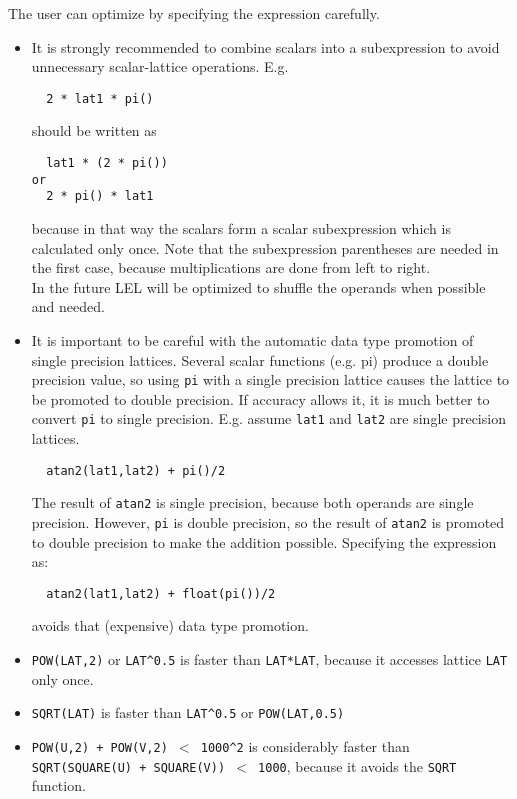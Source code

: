 The user can optimize by specifying the expression carefully.
\begin{itemize}
\item
It is strongly recommended to combine scalars into a subexpression to
avoid unnecessary scalar-lattice operations. E.g.
\begin{verbatim}
  2 * lat1 * pi()
\end{verbatim}
should be written as
\begin{verbatim}
  lat1 * (2 * pi())
or
  2 * pi() * lat1
\end{verbatim}
because in that way the scalars form a scalar subexpression
which is calculated only once. Note that the subexpression parentheses
are needed in the first case, because multiplications are done from
left to right.
\\In the future LEL will be optimized to shuffle the operands when
possible and needed.

\item
It is important to be careful with the automatic data type promotion
of single precision lattices. Several scalar functions (e.g. pi)
produce a double precision value, so using \texttt{pi} with a
single precision lattice causes the lattice to be promoted to double
precision. If accuracy allows it, it is much better to convert
\texttt{pi} to single precision.
E.g. assume \texttt{lat1} and \texttt{lat2} are single precision lattices.
\begin{verbatim}
  atan2(lat1,lat2) + pi()/2
\end{verbatim}
The result of \texttt{atan2} is single precision, because both
operands are single precision. However, \texttt{pi} is double
precision, so the result of \texttt{atan2} is promoted to double
precision to make the addition possible. Specifying the expression as:
\begin{verbatim}
  atan2(lat1,lat2) + float(pi())/2
\end{verbatim}
avoids that (expensive) data type promotion.

\item
\texttt{POW(LAT,2)} or \texttt{LAT}\verb+^+\texttt{0.5}
is faster than \texttt{LAT*LAT}, because it accesses lattice
\texttt{LAT} only once.

\item
\texttt{SQRT(LAT)} is faster than \texttt{LAT}\verb+^+\texttt{0.5}
or \texttt{POW(LAT,0.5)}

\item
\texttt{POW(U,2) + POW(V,2) $<$ 1000}\verb+^+\texttt{2} is considerably faster
than
\\\texttt{SQRT(SQUARE(U) + SQUARE(V)) $<$ 1000}, because it avoids the
\texttt{SQRT} function.


\end{itemize}
